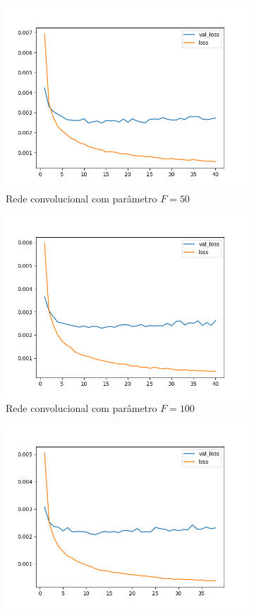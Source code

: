 \begin{figure}[p]
\begin{subfigure}{.5\textwidth}
  \centering
  \includegraphics[width=.8\linewidth]{figuras/ape-ajustes-hiper-parametros/cnn-50-k-2.png}
  \caption{Rede convolucional com parâmetro $F = 50$}
  \label{fig:cnn-50-k-2}
\end{subfigure}%
\begin{subfigure}{.5\textwidth}
  \centering
  \includegraphics[width=.8\linewidth]{figuras/ape-ajustes-hiper-parametros/cnn-100-k-2.png}
  \caption{Rede convolucional com parâmetro $F = 100$}
  \label{fig:cnn-100-k-2}
\end{subfigure}
\begin{subfigure}{.5\textwidth}
  \centering
  \includegraphics[width=.8\linewidth]{figuras/ape-ajustes-hiper-parametros/cnn-200-k-2.png}

\end{subfigure}
\end{figure}
